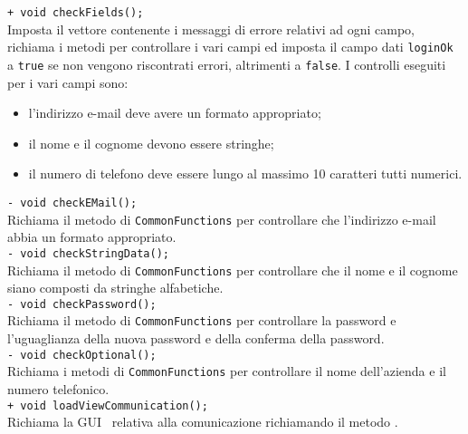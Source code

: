 {{\begin{sloppypar}
{{{\begin{itemize}
{					\texttt{+ void checkFields();}\\
					Imposta il vettore contenente i messaggi di errore relativi ad ogni campo, richiama i metodi per controllare i vari campi ed imposta il campo dati \texttt{loginOk} a \texttt{true} se non vengono riscontrati errori, altrimenti a \texttt{false}. I controlli eseguiti per i vari campi sono:
					\begin{itemize}
						\item l'indirizzo e-mail deve avere un formato appropriato;
						\item il nome e il cognome devono essere stringhe;
						\item il numero di telefono deve essere lungo al massimo 10 caratteri tutti numerici.
					\end{itemize}	
					
					\texttt{- void checkEMail();}\\		
					Richiama il metodo di \texttt{CommonFunctions} per controllare che l'indirizzo e-mail abbia un formato appropriato.\\
	
					\texttt{- void checkStringData();}\\
					Richiama il metodo di \texttt{CommonFunctions} per controllare che il nome e il cognome siano composti da stringhe alfabetiche.\\
	
					\texttt{- void checkPassword();}\\
					Richiama il metodo di \texttt{CommonFunctions} per controllare la password e l'uguaglianza della nuova password e della conferma della password.\\

					\texttt{- void checkOptional();}\\
					Richiama i metodi di \texttt{CommonFunctions} per controllare il nome dell'azienda e il numero telefonico.\\
					
					\texttt{+ void loadViewCommunication();}\\
					Richiama la GUI\g~ relativa alla comunicazione richiamando il metodo .\\
				}
			\end{itemize}
			}

		

}}
\end{sloppypar}}}
